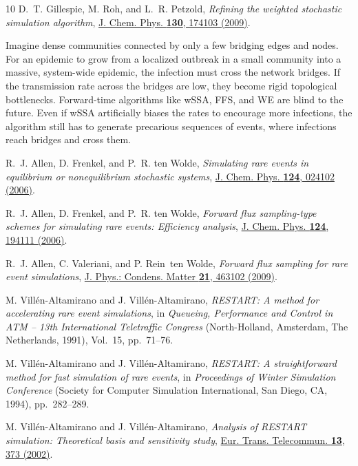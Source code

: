 \documentclass[english,10pt,aps,pra,twocolumn,superscriptaddress,floatfix,fleqn]{revtex4-2}
\begin{document}
\begin{thebibliography}{10}
D.~T. Gillespie, M. Roh, and L.~R. Petzold, {\em Refining the weighted
  stochastic simulation algorithm}, \href{http://dx.doi.org/10.1063/1.3116791}
  {J. Chem. Phys. {\bf 130},  174103  (2009)}.

Imagine dense communities connected by only a few bridging edges and nodes. For
  an epidemic to grow from a localized outbreak in a small community into a
  massive, system-wide epidemic, the infection must cross the network bridges.
  If the transmission rate across the bridges are low, they become rigid
  topological bottlenecks. Forward-time algorithms like wSSA, FFS, and WE are
  blind to the future. Even if wSSA artificially biases the rates to encourage
  more infections, the algorithm still has to generate precarious sequences of
  events, where infections reach bridges and cross them.

R.~J. Allen, D. Frenkel, and P.~R. ten Wolde, {\em Simulating rare events in
  equilibrium or nonequilibrium stochastic systems},
  \href{http://dx.doi.org/10.1063/1.2140273} {J. Chem. Phys. {\bf 124},  024102
   (2006)}.

R.~J. Allen, D. Frenkel, and P.~R. ten Wolde, {\em Forward flux sampling-type
  schemes for simulating rare events: Efficiency analysis},
  \href{http://dx.doi.org/10.1063/1.2198827} {J. Chem. Phys. {\bf 124},  194111
   (2006)}.

R.~J. Allen, C. Valeriani, and P. Rein~ten Wolde, {\em Forward flux sampling
  for rare event simulations},
  \href{http://dx.doi.org/10.1088/0953-8984/21/46/463102} {J. Phys.: Condens.
  Matter {\bf 21},  463102  (2009)}.

M. Vill{\'e}n-Altamirano and J. Vill{\'e}n-Altamirano, {\em RESTART: A method
  for accelerating rare event simulations},  in {\em Queueing, Performance and
  Control in ATM -- 13th International Teletraffic Congress} (North-Holland,
  Amsterdam, The Netherlands, 1991), Vol.~15, pp.\ 71--76.

M. Vill{\'e}n-Altamirano and J. Vill{\'e}n-Altamirano, {\em RESTART: A
  straightforward method for fast simulation of rare events},  in {\em
  Proceedings of Winter Simulation Conference} (Society for Computer Simulation
  International, San Diego, CA, 1994), pp.\ 282--289.

M. Vill{\'e}n-Altamirano and J. Vill{\'e}n-Altamirano, {\em Analysis of RESTART
  simulation: Theoretical basis and sensitivity study},
  \href{http://dx.doi.org/10.1002/ett.4460130409} {Eur. Trans. Telecommun. {\bf
  13},  373  (2002)}.


\end{thebibliography}
\end{document}
